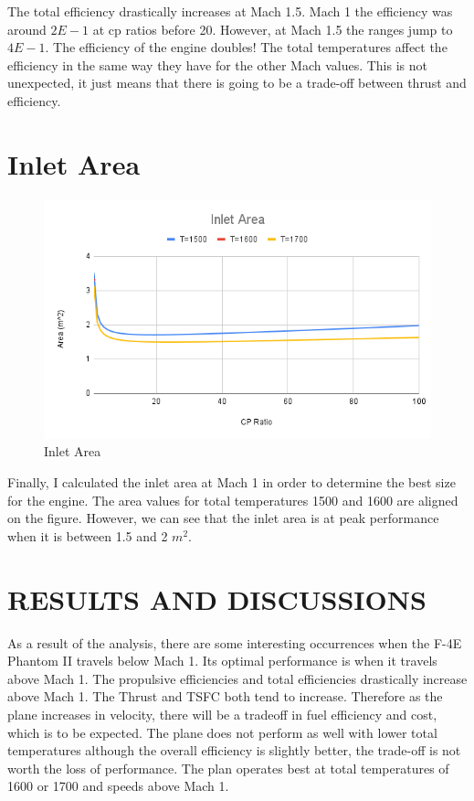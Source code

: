 \documentclass[12pt]{report}
\begin{document}
The total efficiency drastically increases at Mach 1.5. Mach 1 the efficiency was around $2E-1$ at cp ratios before 20. However, at Mach 1.5 the ranges jump to $4E-1$. The efficiency of the engine doubles! The total temperatures affect the efficiency in the same way they have for the other Mach values. This is not unexpected, it just means that there is going to be a trade-off between thrust and efficiency.
\chapter{Inlet Area}
\begin{figure}[H]
    \centering
    \includegraphics[width=15.5 cm]{Inlet Area.png}
    \caption{Inlet Area}
    \label{fig:Inlet Area}
\end{figure}

Finally, I calculated the inlet area at Mach 1 in order to determine the best size for the engine.  The area values for total temperatures 1500 and 1600 are aligned on the figure.  However, we can see that the inlet area is at peak performance when it is between 1.5 and 2 $m^2$.
\chapter{RESULTS AND DISCUSSIONS}
As a result of the analysis, there are some interesting occurrences when the F-4E Phantom II travels below Mach 1. Its optimal performance is when it travels above Mach 1.  The propulsive efficiencies and total efficiencies drastically increase above Mach 1.  The Thrust and TSFC both tend to increase.  Therefore as the plane increases in velocity, there will be a tradeoff in fuel efficiency and cost, which is to be expected. The plane does not perform as well with lower total temperatures although the overall efficiency is slightly better, the trade-off is not worth the loss of performance.  The plan operates best at total temperatures of 1600 or 1700 and speeds above Mach 1.
\newpage
\end{document}
